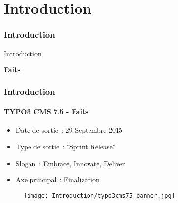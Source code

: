 %

\section{Introduction}
\begin{frame}[fragile]
	\frametitle{Introduction}

	\begin{center}\huge{Introduction}\end{center}
	\begin{center}\huge{\color{typo3darkgrey}\textbf{Faits}}\end{center}

\end{frame}

\begin{frame}[fragile]
	\frametitle{Introduction}
	\framesubtitle{TYPO3 CMS 7.5 - Faits}

	\begin{itemize}
		\item Date de sortie~: 29 Septembre 2015
		\item Type de sortie~: "Sprint Release"
		\item Slogan~: Embrace, Innovate, Deliver
		\item Axe principal~: Finalization
	\end{itemize}

	\begin{figure}
		\texttt{[image: Introduction/typo3cms75-banner.jpg]}
	\end{figure}

\end{frame}

